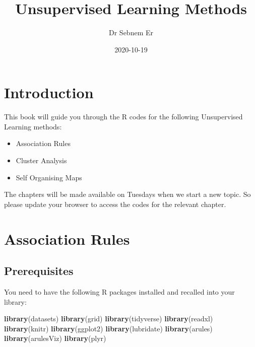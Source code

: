 \documentclass[
]{book}
\title{Unsupervised Learning Methods}
\author{Dr Sebnem Er}
\date{2020-10-19}
\newenvironment{Shaded}{\begin{snugshade}}{\end{snugshade}}
\newcommand{\KeywordTok}[1]{\textcolor[rgb]{0.13,0.29,0.53}{\textbf{#1}}}
\newcommand{\NormalTok}[1]{#1}
\providecommand{\tightlist}{%
  \setlength{\itemsep}{0pt}\setlength{\parskip}{0pt}}
\begin{document}
\maketitle

{
\setcounter{tocdepth}{1}
\tableofcontents
}
\hypertarget{introduction}{%
\chapter{Introduction}\label{introduction}}

This book will guide you through the R codes for the following Unsupervised Learning methods:

\begin{itemize}
\tightlist
\item
  Association Rules
\item
  Cluster Analysis
\item
  Self Organising Maps
\end{itemize}

The chapters will be made available on Tuesdays when we start a new topic. So please update your browser to access the codes for the relevant chapter.

\hypertarget{association-rules}{%
\chapter{Association Rules}\label{association-rules}}

\hypertarget{prerequisites}{%
\section{Prerequisites}\label{prerequisites}}

You need to have the following R packages installed and recalled into your library:

\begin{Shaded}
\begin{Highlighting}[]
\KeywordTok{library}\NormalTok{(datasets)}
\KeywordTok{library}\NormalTok{(grid)}
\KeywordTok{library}\NormalTok{(tidyverse)}
\KeywordTok{library}\NormalTok{(readxl)}
\KeywordTok{library}\NormalTok{(knitr)}
\KeywordTok{library}\NormalTok{(ggplot2)}
\KeywordTok{library}\NormalTok{(lubridate)}
\KeywordTok{library}\NormalTok{(arules)}
\KeywordTok{library}\NormalTok{(arulesViz)}
\KeywordTok{library}\NormalTok{(plyr)}
\end{Highlighting}
\end{Shaded}
\end{document}
